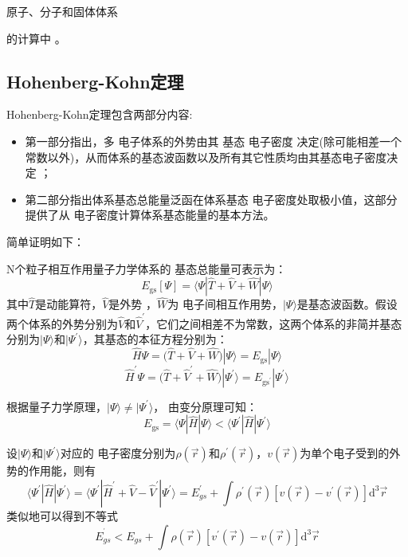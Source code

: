 原子、分子和固体体系{的计算中%
。

\subsection{Hohenberg-Kohn定理}
Hohenberg-Kohn定理\cite{PR136-B864_1964}包含两部分{内容}:
\begin{itemize}
	\item 第一部分指出，多%
{电}子体系的外势由其%
基态%
{电}子密度%
决定(除可能相差一个常数以外)，从而体系的基态波函数以及所有其它性质均由其基态电子密度决定
；\item 第二部分指出体系基态总能量{泛函}在体系基态%
{电}子密度处取极小{值}，这部分%
{提供}了从%
{电}子密度计算体系基态能量的基本方法。
\end{itemize}
简单证明如下：

N个粒子相互作用量子力学体系的%
{基态总能量}可表示为：
\begin{equation}
	{E_{\mathrm{gs}}[\Psi]}%
=\langle\Psi%
|\hat{T}+\hat{V}+\hat{W}|\Psi%
\rangle
	\label{eq:DFT_01}
\end{equation}
其中$\hat{T}$是动能算符，$\hat{V}$是外势%
，$\hat{W}$为%
{电}子间相互作用势{，$|\Psi\rangle$是基态波函数}。假设两个体系的外势分别为$\hat{V}$和$\hat V^{\prime}$，它们之间相差不为常数，这两个体系的非简并基态分别为$|\Psi\rangle$和$|\Psi^{\prime}\rangle$，其基态的本征方程分别为：
$${\hat H\Psi=}\bigl(\hat{T}+\hat{V}+\hat{W}\bigr)|\Psi\rangle=E_{\mathrm{gs}}|\Psi\rangle$$
$${\hat H^{\prime}\Psi=}\bigl(\hat{T}+\hat V^{\prime}+\hat{W}\bigr)|\Psi^{\prime}\rangle=E_{\mathrm{gs}^{\prime}}|\Psi^{\prime}\rangle$$

{根据量子力学原理，}$|\Psi\rangle{\neq}|\Psi^{\prime}\rangle$，%
由变分原理可知：
$$E_{\mathrm{gs}}=\langle\Psi|\hat{H}|\Psi\rangle<\langle\Psi^{\prime}|\hat{H}|\Psi^{\prime}\rangle$$

设$|\Psi\rangle$和$|\Psi^{\prime}\rangle$对应的%
{电}子密度分别为$\rho(\vec{r})
$和$\rho^{\prime}(\vec{r})$，{$v(\vec r)$为单个电子受到的外势的作用能，则}有
$$\langle\Psi^{\prime}|\hat{H}|\Psi^{\prime}\rangle=\langle\Psi^{\prime}|\hat H^{\prime}+\hat{V}-\hat V^{\prime}|\Psi^{\prime}\rangle=E^{\prime}_{gs}+\int{\rho^{\prime}(\vec{r})[v(\vec{r})-v^{\prime}(\vec{r})]\textrm{d}^3\vec{r}}$$
{类似地}可以得到不等式
$$E^{^{\prime}}_{gs}<E_{gs}+\int{\rho(\vec{r})[v^{\prime}(\vec{r})-v(\vec{r})]\textrm{d}^{3}\vec{r}}$$

}
